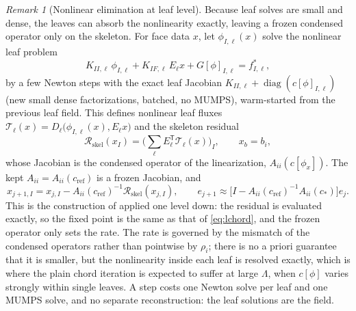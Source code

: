 \documentclass[11pt,a4paper]{article}
\theoremstyle{remark}\newtheorem{remark}{Remark}
\newcommand{\cR}{c_{\mathrm{ref}}}
\DeclareMathOperator{\diag}{diag}
\begin{document}
\begin{remark}[Nonlinear elimination at leaf level]\label{rem:leafelim}
Because leaf solves are small and dense, the leaves can absorb the
nonlinearity exactly, leaving a frozen condensed operator only on the
skeleton. For face data $x$, let $\phi_{I,\ell}(x)$ solve the nonlinear leaf
problem
\begin{equation}
  K_{II,\ell}\,\phi_{I,\ell}+K_{IF,\ell}\,E_\ell x+G[\phi]_{I,\ell}=f^*_{I,\ell},
\end{equation}
by a few Newton steps with the exact leaf Jacobian $K_{II,\ell}+\diag(c[\phi]_{I,\ell})$
(new small dense factorizations, batched, no MUMPS), warm-started from the
previous leaf field. This defines nonlinear leaf fluxes
$\mathcal T_\ell(x)=D_\ell\big(\phi_{I,\ell}(x),E_\ell x\big)$ and the skeleton
residual
\begin{equation}
  \mathcal R_{\mathrm{skel}}(x_I)=\Big(\sum_\ell E_\ell^{\mathsf T}\mathcal T_\ell(x)\Big)_I,
  \qquad x_b=b_i ,
\end{equation}
whose Jacobian is the condensed operator of the linearization,
$A_{ii}(c[\phi_x])$. The kept $A_{ii}=A_{ii}(\cR)$ is a frozen Jacobian, and
\begin{equation}
  x_{j+1,I}=x_{j,I}-A_{ii}(\cR)^{-1}\mathcal R_{\mathrm{skel}}(x_{j,I}),\qquad
  e_{j+1}\approx\big[I-A_{ii}(\cR)^{-1}A_{ii}(c_*)\big]e_j .
\end{equation}
This is the construction of  applied one level down: the
residual is evaluated exactly, so the fixed point is the same as that of
\eqref{eq:lchord}, and the frozen operator only sets the rate. The rate is
governed by the mismatch of the condensed operators rather than pointwise by
$\rho_i$; there is no a priori guarantee that it is smaller, but the
nonlinearity inside each leaf is resolved exactly, which is where the plain
chord iteration is expected to suffer at large $\Lambda$, when $c[\phi]$ varies
strongly within single leaves. A step costs one Newton solve per leaf and one
MUMPS solve, and no separate reconstruction: the leaf solutions are the field.
\end{remark}
\end{document}

